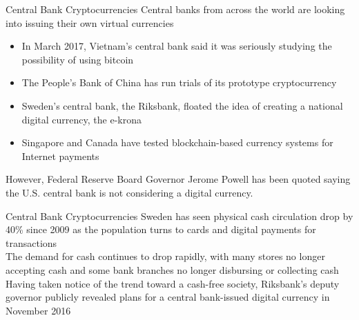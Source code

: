 \documentclass[10pt]{beamer}
\begin{document}
\begin{frame}{Central Bank Cryptocurrencies}
	Central banks from across the world are looking into issuing their own virtual currencies
	\begin{itemize}
		\item In March 2017, Vietnam's central bank said it was seriously studying the possibility of using bitcoin
		\item The People's Bank of China has run trials of its prototype cryptocurrency
		\item Sweden's central bank, the Riksbank, floated the idea of creating a national digital currency, the e-krona
		\item Singapore and Canada have tested blockchain-based currency systems for Internet payments
	\end{itemize}
	However, Federal Reserve Board Governor Jerome Powell has been quoted saying the U.S. central bank is not considering a digital currency.
\end{frame}


\begin{frame}{Central Bank Cryptocurrencies}
	Sweden has seen physical cash circulation drop by 40\% since 2009 as the population turns to cards and digital payments for transactions\\ \vspace{3mm}
	The demand for cash continues to drop rapidly, with many stores no longer accepting cash and some bank branches no longer disbursing or collecting cash\\ \vspace{3mm}
	Having taken notice of the trend toward a cash-free society, Riksbank's deputy governor publicly revealed plans for a central bank-issued digital currency in November 2016\\ \vspace{3mm}
\end{frame}


\end{document}

